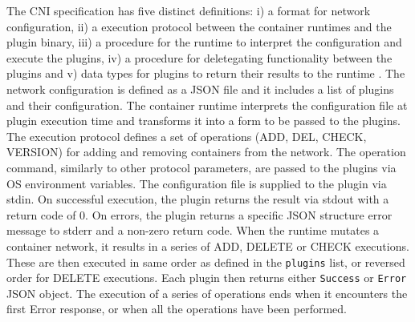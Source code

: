 \documentclass[english, 12pt, a4paper, sci, utf8, a-2b, online]{aaltothesis}
\begin{document}
The CNI specification has five distinct definitions: i) a format for network configuration, ii) a execution protocol between the container runtimes and the plugin binary, iii) a procedure for the runtime to interpret the configuration and execute the plugins, iv) a procedure for deletegating functionality between the plugins and v) data types for plugins to return their results to the runtime \cite{cni}. The network configuration is defined as a JSON file and it includes a list of plugins and their configuration. The container runtime interprets the configuration file at plugin execution time and transforms it into a form to be passed to the plugins. The execution protocol defines a set of operations (ADD, DEL, CHECK, VERSION) for adding and removing containers from the network. The operation command, similarly to other protocol parameters, are passed to the plugins via OS environment variables. The configuration file is supplied to the plugin via stdin. On successful execution, the plugin returns the result via stdout with a return code of 0. On errors, the plugin returns a specific JSON structure error message to stderr and a non-zero return code. When the runtime mutates a container network, it results in a series of ADD, DELETE or CHECK executions. These are then executed in same order as defined in the \texttt{plugins} list, or reversed order for DELETE executions. Each plugin then returns either \texttt{Success} or \texttt{Error} JSON object. The execution of a series of operations ends when it encounters the first Error response, or when all the operations have been performed.




\end{document}
